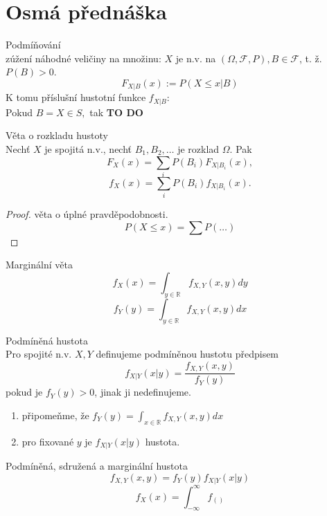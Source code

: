 \documentclass[../main.tex]{subfiles}
\begin{document}
\section{Osmá přednáška}

\begin{definition}
    Podmíňování\\

    zúžení náhodné veličiny na množinu: $X$ je n.v. na $(\Omega, \mathcal{F},P), B \in \mathcal{F}$, t. ž. $P(B) >0$.
    \[F_{X|B}(x):= P(X \leq x |B)\]
    K tomu příslušní hustotní funkce $f_{X|B}$:\\
    Pokud $B = {X\in S},$ tak \textbf{TO DO}
\end{definition}
\begin{theorem}
    Věta o rozkladu hustoty\\

    Nechť $X$ je spojitá n.v., nechť $B_1,B_2,\dots$ je rozklad $\Omega$. Pak
    \[F_X(x) = \sum_i P(B_i)F_{X|B_i}(x),\]
    \[f_X(x) = \sum_i P(B_i)f_{X|B_i}(x).\]
    \begin{proof}
        věta o úplné pravděpodobnosti. 
        \[P(X\leq x) = \sum P(\dots)\]
    \end{proof}
\end{theorem}

\begin{theorem}
    Marginální věta\\

    \[f_X(x) = \int_{y\in \mathbb{R}} f_{X,Y}(x,y)dy\]
    \[f_Y(y) = \int_{y\in \mathbb{R}} f_{X,Y}(x,y)dx\]
\end{theorem}

\begin{definition}
    Podmíněná hustota\\

    Pro spojité n.v. $X,Y$ definujeme podmíněnou hustotu předpisem
    \[f_{X|Y}(x|y) = \frac{f_{X,Y}(x,y)}{f_{Y}(y)}\]
    pokud je $f_Y(y) > 0$, jinak ji nedefinujeme.
    \begin{enumerate}
        \item připomeňme, že $f_Y(y) = \int_{x\in \mathbb{R}}f_{X,Y}(x,y)dx$
        \item pro fixované $y$ je $f_{X|Y}(x|y)$ hustota.
    \end{enumerate}
\end{definition}
\begin{theorem}
    Podmíněná, sdružená a marginální hustota\\

    \[f_{X,Y}(x,y) = f_Y(y)f_{X|Y}(x|y)\]
    \[f_X(x) = \int^\infty_{-\infty} f_()\]
\end{theorem}
\end{document}
